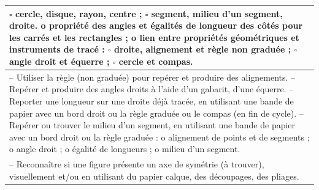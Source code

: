 \begin{center}
\begin{minipage}{16cm}
{\begin{tabular}{|p{14.9cm}|}
            \hspace*{10mm} $\square$ cercle, disque, rayon, centre ; \newline
            \hspace*{10mm} $\square$ segment, milieu d’un segment, droite. \newline
            \hspace*{5mm} o propriété des angles et égalités de longueur des côtés pour les carrés et les rectangles ; \newline
            \hspace*{5mm} o lien entre propriétés géométriques et instruments de tracé : \newline
            \hspace*{10mm} $\square$ droite, alignement et règle non graduée ; \newline
            \hspace*{10mm} $\square$ angle droit et équerre ; \newline
            \hspace*{10mm} $\square$ cercle et compas. \\
            \hline 
            -- Utiliser la règle (non graduée) pour repérer et produire des alignements. \newline
            -- Repérer et produire des angles droits à l'aide d’un gabarit, d'une équerre. \newline
            -- Reporter une longueur sur une droite déjà tracée, en utilisant une bande de papier avec un bord droit ou la règle graduée ou le compas (en fin de cycle). \newline
            -- Repérer ou trouver le milieu d’un segment, en utilisant une bande de papier avec un bord droit ou la règle graduée : \newline
            \hspace*{5mm} o alignement de points et de segments ; \newline
            \hspace*{5mm} o angle droit ; \newline
            \hspace*{5mm} o égalité de longueurs ; \newline
            \hspace*{5mm} o milieu d’un segment. \\
            \hline
            -- Reconnaître si une figure présente un axe de symétrie (à trouver), visuellement et/ou en utilisant du papier calque, des découpages, des pliages. \newline

\end{tabular}}
\end{minipage}
\end{center}
